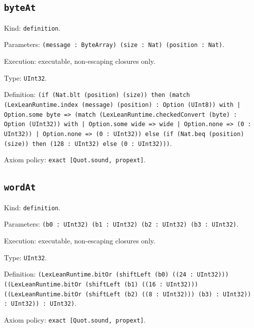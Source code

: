 \documentclass[11pt]{article}
\begin{document}
\subsection*{\texttt{byteAt}}
\noindent Kind: \texttt{definition}.\par
\noindent Parameters: \texttt{(message : ByteArray) (size : Nat) (position : Nat)}.\par
\noindent Execution: executable, non-escaping closures only.\par
\noindent Type: \texttt{UInt32}.\par
\noindent Definition: \texttt{(if (Nat.blt (position) (size)) then (match (LexLeanRuntime.index (message) (position) : Option (UInt8)) with | Option.some byte => (match (LexLeanRuntime.checkedConvert (byte) : Option (UInt32)) with | Option.some wide => wide | Option.none => (0 : UInt32)) | Option.none => (0 : UInt32)) else (if (Nat.beq (position) (size)) then (128 : UInt32) else (0 : UInt32)))}.\par
\noindent Axiom policy: \texttt{exact [Quot.sound, propext]}.\par
\subsection*{\texttt{wordAt}}
\noindent Kind: \texttt{definition}.\par
\noindent Parameters: \texttt{(b0 : UInt32) (b1 : UInt32) (b2 : UInt32) (b3 : UInt32)}.\par
\noindent Execution: executable, non-escaping closures only.\par
\noindent Type: \texttt{UInt32}.\par
\noindent Definition: \texttt{(LexLeanRuntime.bitOr (shiftLeft (b0) ((24 : UInt32))) ((LexLeanRuntime.bitOr (shiftLeft (b1) ((16 : UInt32))) ((LexLeanRuntime.bitOr (shiftLeft (b2) ((8 : UInt32))) (b3) : UInt32)) : UInt32)) : UInt32)}.\par
\noindent Axiom policy: \texttt{exact [Quot.sound, propext]}.\par
\end{document}
